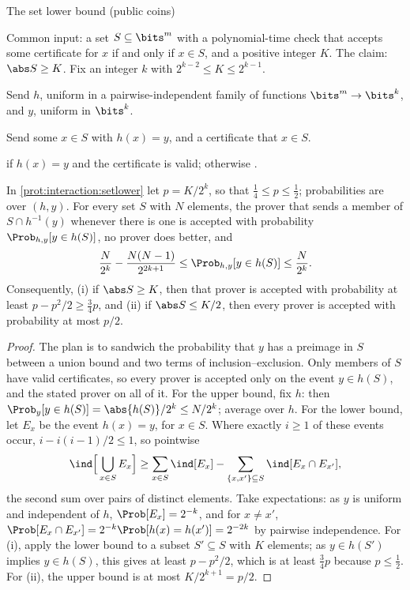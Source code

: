 \begin{refsection}
\begin{protocol}{The set lower bound (public coins)}\label{prot:interaction:setlower}
\item[\act{V}] Common input: a set $S\subseteq\bits^m$ with a polynomial-time check that accepts some certificate for $x$ if and only if $x\in S$, and a positive integer $K$. The claim: $\abs S\ge K$. Fix an integer $k$ with $2^{k-2}\le K\le2^{k-1}$.
\item[\msg{V}{P}] Send $h$, uniform in a pairwise-independent family of functions $\bits^m\to\bits^k$, and $y$, uniform in $\bits^k$.
\item[\msg{P}{V}] Send some $x\in S$ with $h(x)=y$, and a certificate that $x\in S$.
\item[\act{V}] \acc{} if $h(x)=y$ and the certificate is valid; otherwise \rej.
\end{protocol}

\begin{theorem}\label{thm:interaction:setlower}
In \cref{prot:interaction:setlower} let $p=K/2^k$, so that $\frac14\le p\le\frac12$; probabilities are over $(h,y)$. For every set $S$ with $N$ elements, the prover that sends a member of $S\cap h^{-1}(y)$ whenever there is one is accepted with probability $\Prob_{h,y}[y\in h(S)]$, no prover does better, and
\begin{equation}\label{eq:interaction:sandwich}
  \frac{N}{2^k}-\frac{N(N-1)}{2^{2k+1}}\le\Prob_{h,y}[y\in h(S)]\le\frac{N}{2^k}.
\end{equation}
Consequently, (i) if $\abs S\ge K$, then that prover is accepted with probability at least $p-p^2/2\ge\frac34p$, and (ii) if $\abs S\le K/2$, then every prover is accepted with probability at most $p/2$.
\end{theorem}

\begin{proof}
The plan is to sandwich the probability that $y$ has a preimage in $S$ between a union bound and two terms of inclusion--exclusion. Only members of $S$ have valid certificates, so every prover is accepted only on the event $y\in h(S)$, and the stated prover on all of it. For the upper bound, fix $h$: then $\Prob_y[y\in h(S)]=\abs{h(S)}/2^k\le N/2^k$; average over $h$. For the lower bound, let $E_x$ be the event $h(x)=y$, for $x\in S$. Where exactly $i\ge1$ of these events occur, $i-i(i-1)/2\le1$, so pointwise
\[
  \ind\Bigl[\,\bigcup_{x\in S}E_x\Bigr]\ge\sum_{x\in S}\ind[E_x]-\sum_{\{x,x'\}\subseteq S}\ind[E_x\cap E_{x'}],
\]
the second sum over pairs of distinct elements. Take expectations: as $y$ is uniform and independent of $h$, $\Prob[E_x]=2^{-k}$, and for $x\ne x'$, $\Prob[E_x\cap E_{x'}]=2^{-k}\Prob[h(x)=h(x')]=2^{-2k}$ by pairwise independence. For (i), apply the lower bound to a subset $S'\subseteq S$ with $K$ elements; as $y\in h(S')$ implies $y\in h(S)$, this gives at least $p-p^2/2$, which is at least $\frac34p$ because $p\le\frac12$. For (ii), the upper bound is at most $K/2^{k+1}=p/2$.
\end{proof}


\end{refsection}
